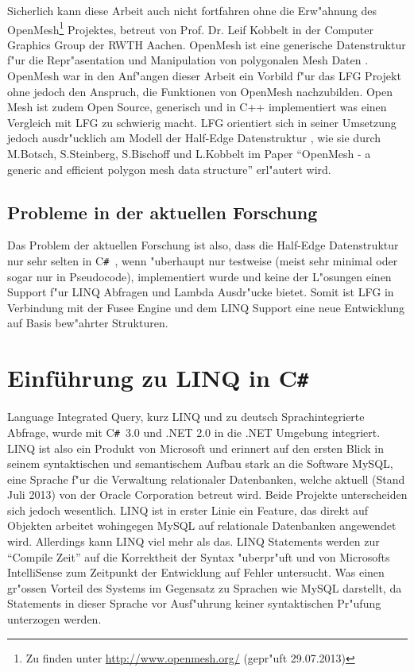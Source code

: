 \documentclass[pagesize, paper=a4, fontsize=12pt,titlepage=true, headings=small, headnosepline, abstractoff, liststotoc, nochapterprefix, plainheadsepline]{scrreprt}
\newcommand{\CS}{C\texttt{\#}}
\newcommand{\CSS}{C\texttt{\# }}
\newcommand{\HES}{Half-Edge Datenstruktur }
\begin{document}
Sicherlich kann diese Arbeit auch nicht fortfahren ohne die Erw"ahnung des OpenMesh\footnote{Zu finden unter \url{http://www.openmesh.org/} (gepr"uft 29.07.2013)} Projektes, betreut von Prof. Dr. Leif Kobbelt in der Computer Graphics Group der RWTH Aachen. OpenMesh ist eine generische Datenstruktur f"ur die Repr"asentation und Manipulation von polygonalen Mesh Daten \cite{Kobbelt.2013}. OpenMesh war in den Anf"angen dieser Arbeit ein Vorbild f"ur das LFG Projekt ohne jedoch den Anspruch, die Funktionen von OpenMesh nachzubilden. Open Mesh ist zudem Open Source, generisch und in C++ implementiert was einen Vergleich mit LFG zu schwierig macht. LFG orientiert sich in seiner Umsetzung jedoch ausdr"ucklich am Modell der \HES, wie sie durch M.Botsch, S.Steinberg, S.Bischoff und L.Kobbelt im Paper "`OpenMesh - a generic and efficient polygon mesh data structure"' \cite{Botsch.2002} erl"autert wird.
		\subsection {Probleme in der aktuellen Forschung}
			Das Problem der aktuellen Forschung ist also, dass die \HES nur sehr selten in \CSS, wenn "uberhaupt nur testweise (meist sehr minimal oder sogar nur in Pseudocode), implementiert wurde und keine der L"osungen einen Support f"ur LINQ Abfragen und Lambda Ausdr"ucke bietet. Somit ist LFG in Verbindung mit der Fusee Engine und dem LINQ Support eine neue Entwicklung auf Basis bew"ahrter Strukturen.
	\section {Einführung zu LINQ in \CS}
		Language Integrated Query, kurz LINQ und zu deutsch Sprachintegrierte Abfrage, wurde mit \CSS 3.0 und .NET 2.0 in die .NET Umgebung integriert. LINQ ist also ein Produkt von Microsoft und erinnert auf den ersten Blick in seinem syntaktischen und semantischem Aufbau stark an die Software MySQL, eine Sprache f"ur die Verwaltung relationaler Datenbanken, welche aktuell (Stand Juli 2013) von der Oracle Corporation betreut wird. Beide Projekte unterscheiden sich jedoch wesentlich. LINQ ist in erster Linie ein Feature, das direkt auf Objekten arbeitet wohingegen MySQL auf relationale Datenbanken angewendet wird. Allerdings kann LINQ viel mehr als das. LINQ Statements werden zur "`Compile Zeit"' auf die Korrektheit der Syntax "uberpr"uft und von Microsofts IntelliSense zum Zeitpunkt der Entwicklung auf Fehler untersucht. Was einen gr"ossen Vorteil des Systems im Gegensatz zu Sprachen wie MySQL darstellt, da Statements in dieser Sprache vor Ausf"uhrung keiner syntaktischen Pr"ufung unterzogen werden.
\newline
\end{document}

